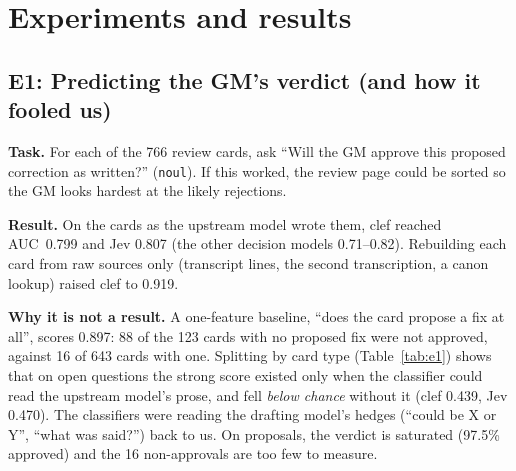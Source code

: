 \documentclass[11pt]{article}
\begin{document}
\section{Experiments and results}

\subsection{E1: Predicting the GM's verdict (and how it fooled us)}
\textbf{Task.} For each of the 766 review cards, ask ``Will the GM approve this proposed correction
as written?'' (\texttt{noul}). If this worked, the review page could be sorted so the GM looks
hardest at the likely rejections.

\textbf{Result.} On the cards as the upstream model wrote them, clef reached AUC~0.799 and Jev 0.807
(the other decision models 0.71--0.82). Rebuilding each card from raw sources only (transcript
lines, the second transcription, a canon lookup) raised clef to 0.919.

\textbf{Why it is not a result.} A one-feature baseline, ``does the card propose a fix at all'',
scores 0.897: 88 of the 123 cards with no proposed fix were not approved, against 16 of 643 cards
with one. Splitting by card type (Table~\ref{tab:e1}) shows that on open questions the strong score
existed only when the classifier could read the upstream model's prose, and fell \emph{below
chance} without it (clef 0.439, Jev 0.470). The classifiers were reading the drafting model's hedges (``could be X or
Y'', ``what was said?'') back to us. On proposals, the verdict is saturated (97.5\% approved) and the
16 non-approvals are too few to measure.

\begin{table}[t]
\centering
\small
{}
\caption{E1, AUC for predicting the GM's verdict. The headline AUC comes from card type and from
upstream prose, not from judgment about the correction itself. The pattern holds for every decision
model tested (open-question AUC 0.73--0.81 with prose, 0.44--0.60 without).}
\label{tab:e1}
\end{table}
\end{document}
